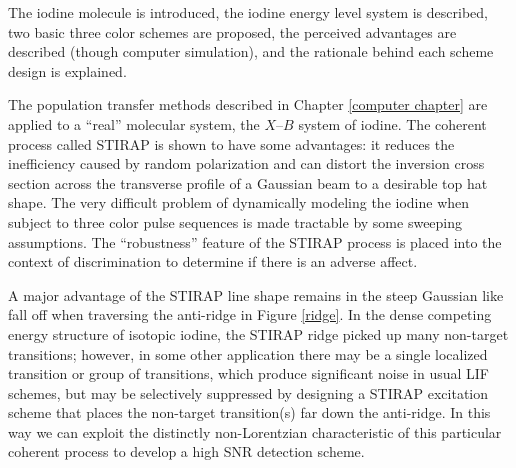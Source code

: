 The iodine molecule is introduced, the iodine energy level system is described, two basic three color schemes are proposed, the perceived advantages are described (though computer simulation), and the rationale behind each scheme design is explained.

The population transfer methods described in Chapter \ref{computer chapter} are applied to a ``real'' molecular system, the $X$--$B$ system of iodine. The coherent process called STIRAP is shown to have some advantages: it reduces the inefficiency caused by random polarization and can distort the inversion cross section across the transverse profile of a Gaussian beam to a desirable top hat shape. The very difficult problem of dynamically modeling the iodine when subject to three color pulse sequences is made tractable by some sweeping assumptions. The ``robustness'' feature of the STIRAP process is placed into the context of discrimination to determine if there is an adverse affect.

A major advantage of the STIRAP line shape remains in the steep Gaussian like fall off when traversing the anti-ridge in Figure \ref{ridge}. In the dense competing energy structure of isotopic iodine, the STIRAP ridge picked up many non-target transitions; however, in some other application there may be a single localized transition or group of transitions, which produce significant noise in usual LIF schemes, but may be selectively suppressed by designing a STIRAP excitation scheme that places the non-target transition(s) far down the anti-ridge. In this way we can exploit the distinctly non-Lorentzian characteristic of this particular coherent process to develop a high SNR detection scheme.

